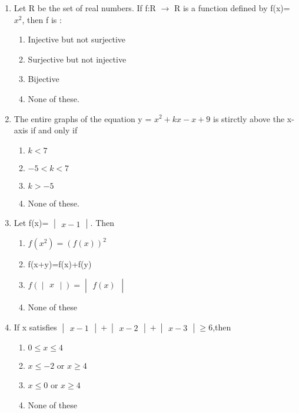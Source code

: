 \begin{enumerate}[label=\arabic*.,ref=\thesubsection.\theenumi]
\item Let R be the set of real numbers. If f:R $\to$ R is a function defined by f(x)=$x^{2}$, then f is :
\begin{enumerate}
\item Injective but not surjective
\item Surjective but not injective
\item Bijective
\item None of these.
\end{enumerate}

\item The entire graphs of the equation y = $x^{2}+kx-x+9$ is stirctly above the x-axis if and only if
\begin{enumerate}
\item $k < 7$
\item $-5 < k < 7$
\item $k > -5$
\item None of these.
\end{enumerate}

\item Let f(x)= $\begin{vmatrix} x-1 \end{vmatrix}$. Then
\begin{enumerate}
\item $f(x^{2})=(f(x))^{2}$
\item f(x+y)=f(x)+f(y)
\item $f(\begin{vmatrix} x \end{vmatrix}) = \begin{vmatrix} f(x) \end{vmatrix}$
\item None of these
\end{enumerate}

\item If x satisfies $\begin{vmatrix} x-1 \end{vmatrix} + \begin{vmatrix} x-2 \end {vmatrix} + \begin{vmatrix} x-3 \end{vmatrix} \geq 6$,then
\begin{enumerate}
\item $0 \leq x \leq 4$
\item $x \leq -2$ or $x \geq 4$
\item $x \leq 0$ or $x \geq 4$
\item None of these
\end{enumerate}


\end{enumerate}
